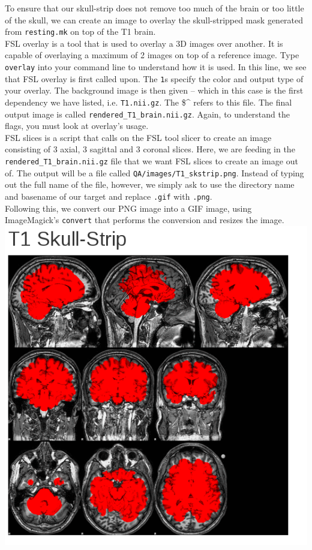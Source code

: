To ensure that our skull-strip does not remove too much of the brain or too little of the skull, we can create an image to overlay the skull-stripped mask generated from \texttt{resting.mk} on top of the T1 brain. \\
\tab{} FSL overlay is a tool that is used to overlay a 3D images over another. It is capable of overlaying a maximum of 2 images on top of a reference image. Type \texttt{overlay} into your command line to understand how it is used. In this line, we see that FSL overlay is first called upon. The \texttt{1}s specify the color and output type of your overlay. The background image is then given -- which in this case is the first dependency we have listed, i.e. \texttt{T1.nii.gz}. The \$\textasciicircum{} refers to this file. The final output image is called \texttt{rendered\_T1\_brain.nii.gz}. Again, to understand the flags, you must look at overlay's usage. \\
 FSL slices is a script that calls on the FSL tool slicer to create an image consisting of 3 axial, 3 sagittal and 3 coronal slices. Here, we are feeding in the \texttt{rendered\_T1\_brain.nii.gz} file that we want FSL slices to create an image out of. The output will be a file called \texttt{QA/images/T1\_skstrip.png}. Instead of typing out the full name of the file, however, we simply ask \maken{} to use the directory name and basename of our target and replace \texttt{.gif} with \texttt{.png}.\\
 Following this, we convert our PNG image into a GIF image, using ImageMagick's \texttt{convert} that performs the conversion and resizes the image.\\

\includegraphics[scale=0.4]{QAskullstrip.png}


